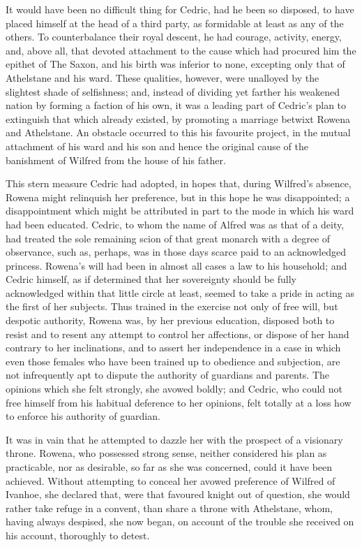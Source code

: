 It would have been no difficult thing for Cedric, had he been so
disposed, to have placed himself at the head of a third party, as
formidable at least as any of the others. To counterbalance their royal
descent, he had courage, activity, energy, and, above all, that devoted
attachment to the cause which had procured him the epithet of The Saxon,
and his birth was inferior to none, excepting only that of Athelstane
and his ward. These qualities, however, were unalloyed by the slightest
shade of selfishness; and, instead of dividing yet farther his weakened
nation by forming a faction of his own, it was a leading part of
Cedric's plan to extinguish that which already existed, by promoting a
marriage betwixt Rowena and Athelstane. An obstacle occurred to this his
favourite project, in the mutual attachment of his ward and his son and
hence the original cause of the banishment of Wilfred from the house of
his father.

This stern measure Cedric had adopted, in hopes that, during Wilfred's
absence, Rowena might relinquish her preference, but in this hope he was
disappointed; a disappointment which might be attributed in part to the
mode in which his ward had been educated. Cedric, to whom the name of
Alfred was as that of a deity, had treated the sole remaining scion of
that great monarch with a degree of observance, such as, perhaps, was in
those days scarce paid to an acknowledged princess. Rowena's will had
been in almost all cases a law to his household; and Cedric himself, as
if determined that her sovereignty should be fully acknowledged within
that little circle at least, seemed to take a pride in acting as the
first of her subjects. Thus trained in the exercise not only of free
will, but despotic authority, Rowena was, by her previous education,
disposed both to resist and to resent any attempt to control her
affections, or dispose of her hand contrary to her inclinations, and to
assert her independence in a case in which even those females who have
been trained up to obedience and subjection, are not infrequently apt to
dispute the authority of guardians and parents. The opinions which she
felt strongly, she avowed boldly; and Cedric, who could not free himself
from his habitual deference to her opinions, felt totally at a loss how
to enforce his authority of guardian.

It was in vain that he attempted to dazzle her with the prospect of a
visionary throne. Rowena, who possessed strong sense, neither considered
his plan as practicable, nor as desirable, so far as she was concerned,
could it have been achieved. Without attempting to conceal her avowed
preference of Wilfred of Ivanhoe, she declared that, were that favoured
knight out of question, she would rather take refuge in a convent, than
share a throne with Athelstane, whom, having always despised, she now
began, on account of the trouble she received on his account, thoroughly
to detest.


